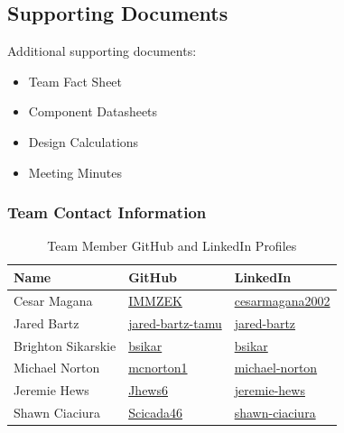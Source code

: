 
\subsection{Supporting Documents}\label{app:supporting}

Additional supporting documents:

\begin{itemize}
    \item Team Fact Sheet
    \item Component Datasheets
    \item Design Calculations
    \item Meeting Minutes
\end{itemize}

\subsubsection{Team Contact Information}\label{sec:team-contacts}

\begin{table}[H]
\centering
\caption{Team Member GitHub and LinkedIn Profiles}
\label{tab:team_contacts}
\begin{tabular}{@{}lll@{}}
\toprule
\textbf{Name} & \textbf{GitHub} & \textbf{LinkedIn} \\
\midrule
Cesar Magana & \href{https://github.com/IMMZEK}{IMMZEK} & \href{https://www.linkedin.com/in/cesarmagana2002/}{cesarmagana2002} \\
Jared Bartz & \href{https://github.com/jared-bartz-tamu}{jared-bartz-tamu} & \href{https://www.linkedin.com/in/jared-bartz/}{jared-bartz} \\
Brighton Sikarskie & \href{https://github.com/bsikar}{bsikar} & \href{https://www.linkedin.com/in/bsikar/}{bsikar} \\
Michael Norton & \href{https://github.com/mcnorton1}{mcnorton1} & \href{https://www.linkedin.com/in/michael-norton-11025025b/}{michael-norton} \\
Jeremie Hews & \href{https://github.com/Jhews6}{Jhews6} & \href{https://www.linkedin.com/in/jeremie-hews-ab91682aa/}{jeremie-hews} \\
Shawn Ciaciura & \href{https://github.com/Scicada46}{Scicada46} & \href{https://www.linkedin.com/in/shawn-ciaciura/}{shawn-ciaciura} \\
\bottomrule
\end{tabular}
\end{table}


